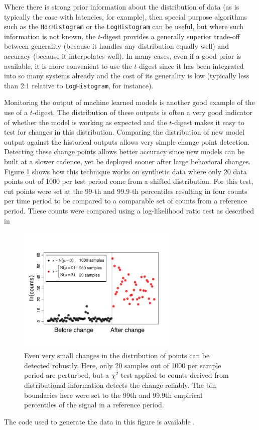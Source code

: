 \documentclass[preprint,12pt, a4paper]{elsarticle}
\begin{document}
Where there is strong prior information about the distribution of data (as is typically the case with latencies, for example), then special purpose algorithms such as the \texttt{HdrHistogram} or the \texttt{LogHistogram} can be useful, but where such information is not known, the $t$-digest provides a generally superior trade-off between generality (because it handles any distribution equally well) and accuracy (because it interpolates well). In many cases, even if a good prior is available, it is more convenient to use the $t$-digest since it has been integrated into so many systems already and the cost of its generality is low (typically less than 2:1 relative to \texttt{LogHistogram}, for instance).

Monitoring the output of machine learned models is another good example of the use of a $t$-digest. The distribution of these outputs is often a very good indicator of whether the model is working as expected and the $t$-digest makes it easy to test for changes in this distribution. Comparing the distribution of new model output  against the historical outputs allows very simple change point detection\cite{machine-learning-logistics, anomaly-detection}. Detecting these change points allows better accuracy since new models can be built at a slower cadence, yet be deployed sooner after large behavioral changes. Figure \ref{fig:change-point} shows how this technique works on synthetic data where only 20 data points out of 1000 per test period come from a shifted distribution. For this test, cut points were set at the 99-th and 99.9-th percentiles resulting in four counts per time period to be compared to a comparable set of counts from a reference period. These counts were compared using a log-likelihood ratio test as described in \cite{dunning93}
\begin{figure}[htb] %
   \centering
   \includegraphics[width=3in]{figures/change-point.pdf} 
   \caption{
   Even very small changes in the distribution of points can be detected robustly. Here, only 20 samples out of 1000 per sample period are perturbed, but a $\chi^2$ test applied to counts derived from distributional information detects the change reliably. The bin boundaries here were set to the 99th and 99.9th empirical percentiles of the signal in a reference period.}
   \label{fig:change-point}
\end{figure}
The code used to generate the data in this figure is available \cite{shift-detection}.
\end{document}
